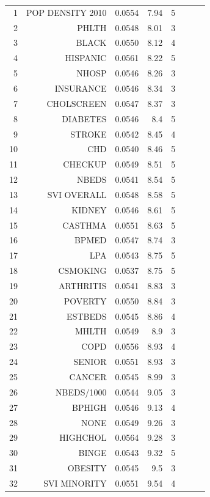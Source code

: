 \documentclass[a4paper, inpress]{jds} %
\renewcommand{\_}{%
    \textunderscore\hspace{0pt}%
}
\begin{document}
\begin{table}[!p]
\begin{tabular}{rrrrrlrl}
1	&	POP\_DENSITY\_2010	&	0.0554	&	7.94	&	5	 \\
2	&	PHLTH	            &	0.0548	&	8.01	&	3	 \\
3	&	BLACK	            &	0.0550	&	8.12	&	4	 \\
4	&	HISPANIC	        &	0.0561	&	8.22	&	5	 \\
5	&	NHOSP	            &	0.0546	&	8.26	&	3	 \\
6	&	INSURANCE	        &	0.0546	&	8.34	&	3	 \\
7	&	CHOLSCREEN	        &	0.0547	&	8.37	&	3	 \\
8	&	DIABETES	        &	0.0546	&	8.4	&	5	 \\
9	&	STROKE	            &	0.0542	&	8.45	&	4	 \\
10	&	CHD	                &	0.0540	&	8.46	&	5	 \\
11	&	CHECKUP	            &	0.0549	&	8.51	&	5	 \\
12	&	NBEDS	            &	0.0541	&	8.54	&	5	 \\
13	&	SVI\_OVERALL	    &	0.0548	&	8.58	&	5	 \\
14	&	KIDNEY	            &	0.0546	&	8.61	&	5	 \\
15	&	CASTHMA	            &	0.0551	&	8.63	&	5	 \\
16	&	BPMED	            &	0.0547	&	8.74	&	3	 \\
17	&	LPA	                &	0.0543	&	8.75	&	5	 \\
18	&	CSMOKING	        &	0.0537	&	8.75	&	5	 \\
19	&	ARTHRITIS	        &	0.0541	&	8.83	&	3	 \\
20	&	POVERTY	            &	0.0550	&	8.84	&	3	 \\
21	&	ESTBEDS	            &	0.0545	&	8.86	&	4	 \\
22	&	MHLTH	            &	0.0549	&	8.9	&	3	 \\
23	&	COPD	            &	0.0556	&	8.93	&	4	 \\
24	&	SENIOR	            &	0.0551	&	8.93	&	3	 \\
25	&	CANCER	            &	0.0545	&	8.99	&	3	 \\
26	&	NBEDS/1000	        &	0.0544	&	9.05	&	3	 \\
27	&	BPHIGH	            &	0.0546	&	9.13	&	4	 \\
\rowcolor{black!5} 28 &	NONE	&	0.0549	&	9.26	&	3	 \\
29	&	HIGHCHOL	        &	0.0564	&	9.28	&	3	 \\
30	&	BINGE	            &	0.0543	&	9.32	&	5	 \\
31	&	OBESITY	            &	0.0545	&	9.5	&	3	 \\
32	&	SVI\_MINORITY	    &	0.0551	&	9.54	&	4	 \\
\bottomrule
\end{tabular}
\end{table}
\end{document}
